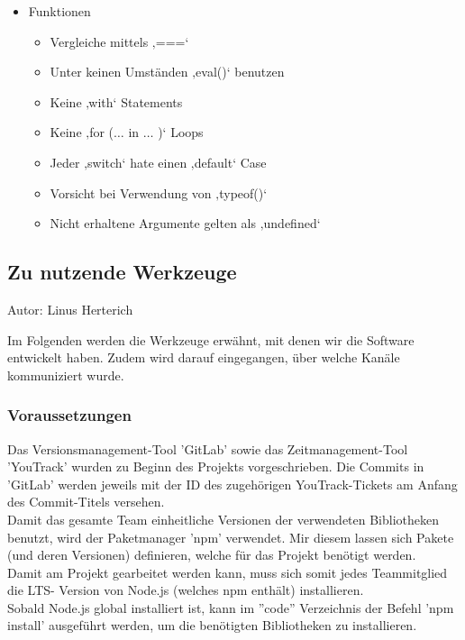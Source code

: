 \documentclass[twoside]{report}
\begin{document}
\begin{itemize}
	\item Funktionen\par

\begin{itemize}
	\item Vergleiche mittels ‚===‘

	\item Unter keinen Umständen ‚eval()‘ benutzen\par

	\item Keine ‚with‘ Statements\par

	\item Keine ‚for ($ \ldots $  in $ \ldots $ )‘ Loops\par

	\item Jeder ‚switch‘ hate einen ‚default‘ Case\par

	\item Vorsicht bei Verwendung von ‚typeof()‘\par

	\item Nicht erhaltene Argumente gelten als ‚undefined‘
\end{itemize}\par
\end{itemize}


\subsection{Zu nutzende Werkzeuge}
{\small Autor: Linus Herterich}

Im Folgenden werden die Werkzeuge erwähnt, mit denen wir die Software
entwickelt haben. Zudem wird darauf eingegangen, über welche Kanäle kommuniziert
wurde.


\subsubsection{Voraussetzungen}
Das Versionsmanagement-Tool 'GitLab' sowie das Zeitmanagement-Tool 'YouTrack'
wurden zu Beginn des Projekts vorgeschrieben. Die Commits in 'GitLab' werden jeweils mit
der ID des zugehörigen YouTrack-Tickets am Anfang des Commit-Titels versehen.
\\Damit das gesamte Team einheitliche Versionen der verwendeten Bibliotheken benutzt,
wird der Paketmanager 'npm' verwendet. Mir diesem lassen sich Pakete (und deren Versionen) definieren,
welche für das Projekt benötigt werden.
\\ Damit am Projekt gearbeitet werden kann, muss sich somit jedes Teammitglied die LTS-
Version von Node.js (welches npm enthält) installieren.
\\ Sobald Node.js global installiert ist, kann im ''code'' Verzeichnis der Befehl
'npm install' ausgeführt werden, um die benötigten Bibliotheken zu installieren.
\end{document}
